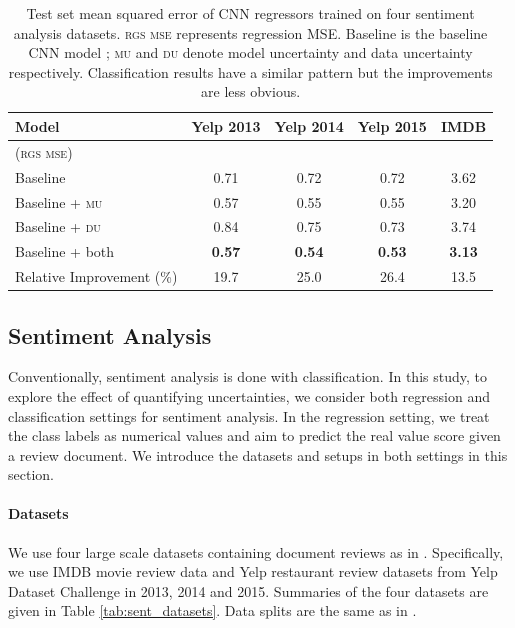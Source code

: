 \documentclass[letterpaper]{article} %
\begin{document}
\begin{table}[t!]
\begin{center}
\begin{tabular}{lcccc}
\hline
{\bf Model} & {\bf Yelp 2013} & {\bf Yelp 2014} & {\bf Yelp 2015} & {\bf IMDB}\\  \hline
(\textsc{rgs mse}) \\
Baseline & 0.71 & 0.72 & 0.72 & 3.62 \\
Baseline + \textsc{mu} & 0.57 & 0.55 & 0.55 & 3.20\\
Baseline + \textsc{du} & 0.84 & 0.75 & 0.73 & 3.74 \\
Baseline + both        & \bf 0.57 & \bf 0.54 & \bf 0.53 & \bf 3.13 \\ \hline
Relative Improvement (\%) & 19.7 & 25.0 & 26.4 & 13.5\\
\hline
\end{tabular}
\end{center}
\caption{\label{tab:sent_results}Test set mean squared error of CNN regressors trained on four sentiment analysis datasets. \textsc{rgs mse} represents regression MSE. Baseline is the baseline CNN model \cite{kim2014convolutional}; \textsc{mu} and \textsc{du} denote model uncertainty and data uncertainty respectively. Classification results have a similar pattern but the improvements are less obvious.
}
\end{table}

\subsection{Sentiment Analysis}
Conventionally, sentiment analysis is done with classification. In this study, to explore the effect of quantifying uncertainties, we consider both regression and classification settings for sentiment analysis. In the regression setting, we treat the class labels as numerical values and aim to predict the real value score given a review document. We introduce the datasets and setups in both settings in this section.

\paragraph{Datasets} We use four large scale datasets containing document reviews as in \cite{tang2015document}. Specifically, we use IMDB movie review data \cite{diao2014jointly} and Yelp restaurant review datasets
from Yelp Dataset Challenge in 2013, 2014 and 2015. Summaries of the four datasets are given in Table \ref{tab:sent_datasets}. Data splits are the same as in \cite{tang2015document,diao2014jointly}.
\end{document}

